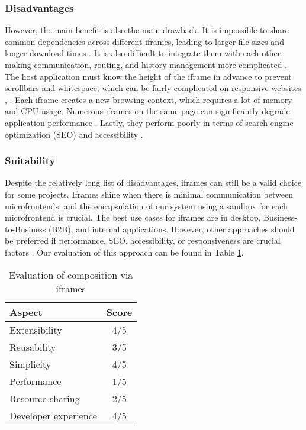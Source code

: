\subsubsection{Disadvantages}
However, the main benefit is also the main drawback. It is impossible to share common dependencies across different iframes, leading to larger file sizes and longer download times \cite{Pavlenko}. It is also difficult to integrate them with each other, making communication, routing, and history management more complicated \cite{Jackson}. The host application must know the height of the iframe in advance to prevent scrollbars and whitespace, which can be fairly complicated on responsive websites \cite{MezzaliraBuildingMf}, \cite{Geers}. Each iframe creates a new browsing context, which requires a lot of memory and CPU usage. Numerous iframes on the same page can significantly degrade application performance \cite{Geers}. Lastly, they perform poorly in terms of search engine optimization (SEO) and accessibility \cite{Geers}.

\subsubsection{Suitability}
Despite the relatively long list of disadvantages, iframes can still be a valid choice for some projects. Iframes shine when there is minimal communication between microfrontends, and the encapsulation of our system using a sandbox for each microfrontend is crucial. The best use cases for iframes are in desktop, Business-to-Business (B2B), and internal applications. However, other approaches should be preferred if performance, SEO, accessibility, or responsiveness are crucial factors \cite{Geers, MezzaliraBuildingMf}. Our evaluation of this approach can be found in Table \ref{table:iframe-evaluation}.
\begin{table}[h]
  \centering
  \begin{tabular}{|p{4cm}|c|}
    \hline
      \textbf{Aspect} & \textbf{Score} \\
    \hline
      Extensibility & 4/5 \\
    \hline
      Reusability & 3/5 \\
    \hline
      Simplicity & 4/5 \\
    \hline
      Performance & 1/5 \\
    \hline
      Resource sharing & 2/5 \\
    \hline
      Developer experience & 4/5 \\
    \hline
  \end{tabular}
  \caption{Evaluation of composition via iframes}
  \label{table:iframe-evaluation}
\end{table}

